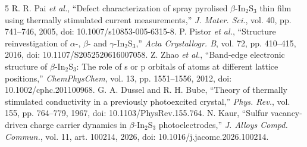 \documentclass[letterpaper, 10pt, conference]{ieeeconf}
\begin{document}
\begin{thebibliography}{5}
 R. R. Pai \emph{et al.}, ``Defect characterization of spray pyrolised $\beta$-In$_2$S$_3$ thin film using thermally stimulated current measurements,'' \emph{J. Mater. Sci.}, vol. 40, pp. 741--746, 2005, doi: 10.1007/s10853-005-6315-8.
 P. Pistor \emph{et al.}, ``Structure reinvestigation of $\alpha$-, $\beta$- and $\gamma$-In$_2$S$_3$,'' \emph{Acta Crystallogr. B}, vol. 72, pp. 410--415, 2016, doi: 10.1107/S2052520616007058.
 Z. Zhao \emph{et al.}, ``Band-edge electronic structure of $\beta$-In$_2$S$_3$: The role of s or p orbitals of atoms at different lattice positions,'' \emph{ChemPhysChem}, vol. 13, pp. 1551--1556, 2012, doi: 10.1002/cphc.201100968.
 G. A. Dussel and R. H. Bube, ``Theory of thermally stimulated conductivity in a previously photoexcited crystal,'' \emph{Phys. Rev.}, vol. 155, pp. 764--779, 1967, doi: 10.1103/PhysRev.155.764.
 N. Kaur, ``Sulfur vacancy-driven charge carrier dynamics in $\beta$-In$_2$S$_3$ photoelectrodes,'' \emph{J. Alloys Compd. Commun.}, vol. 11, art. 100214, 2026, doi: 10.1016/j.jacomc.2026.100214.
\end{thebibliography}
\end{document}
